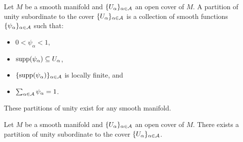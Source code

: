 \begin{definition}\label{def: partition of unity}
    Let $M$ be a smooth manifold and $\{U_{\alpha}\}_{\alpha\in\mathcal{A}}$ an open cover of $M$. A partition of unity subordinate to the cover $\{U_{\alpha}\}_{\alpha\in\mathcal{A}}$ is a collection of smooth functions $\{\psi_{\alpha}\}_{\alpha\in\mathcal{A}}$ such that:
    \begin{itemize}
        \item $0<\psi_{\alpha}<1$, 
        \item $\mathrm{supp}(\psi_{\alpha})\subseteq U_{\alpha}$,
        \item $\{\mathrm{supp}(\psi_{\alpha})\}_{\alpha\in\mathcal{A}}$ is locally finite, and
        \item $\sum_{\alpha\in\mathcal{A}}\psi_{\alpha}=1$. 
    \end{itemize}
\end{definition}
These partitions of unity exist for any smooth manifold. 
\begin{theorem}
    Let $M$ be a smooth manifold and $\{U_{\alpha}\}_{\alpha\in\mathcal{A}}$ an open cover of $M$. There exists a partition of unity subordinate to the cover $\{U_{\alpha}\}_{\alpha\in\mathcal{A}}$.
\end{theorem}
